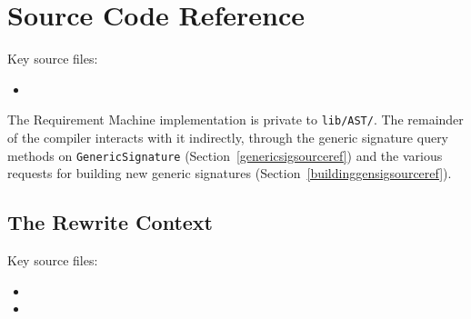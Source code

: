 \documentclass[../generics]{subfiles}
\begin{document}
\section{Source Code Reference}\label{rqm basic operation source ref}

Key source files:
\begin{itemize}
\item {}
\end{itemize}
The Requirement Machine implementation is private to \texttt{lib/AST/}. The remainder of the compiler interacts with it indirectly, through the generic signature query methods on \texttt{GenericSignature} (Section~\ref{genericsigsourceref}) and the various requests for building new generic signatures (Section~\ref{buildinggensigsourceref}).

\subsection*{The Rewrite Context}

Key source files:
\begin{itemize}
\item {}
\item {}
\end{itemize}
\end{document}
